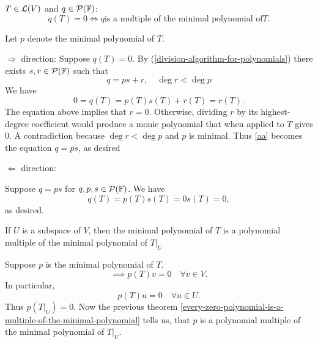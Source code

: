 \setcounter{thm}{28}
\begin{thm}
  \label{thm:every-zero-polynomial-is-a-multiple-of-the-minimal-polynomial}
  $T\in \mathcal{L}(V)$ and $q \in \mathcal{P} (\mathbb{F})$: 
  \begin{equation}
    q(T)=0 \iff q \text{is a multiple of the minimal polynomial of} T.
  \end{equation}
\end{thm}
\begin{prf}
  Let $p$ denote the minimal polynomial of $T$.

	\begin{description}
  
  \item{$\Rightarrow$ direction:}{
			Suppose $q(T)=0$.
			By (\ref{division-algorithm-for-polynomials}) there exists $s,r \in \mathcal{P} (\mathbb{F})$ such that
			\begin{equation}
				q=ps+r, \quad \deg r < \deg p
			\end{equation}
			We have
			\begin{equation}
				\label{aa}
				0 = q(T) = p(T)s(T) + r(T) = r(T).
			\end{equation}
			The equation above implies that $r=0$. Otherwise, dividing $r$ by its highest-degree coefficient would produce a monic polynomial that when applied to $T$ gives $0$. A contradiction because $\deg r < \deg p$ and $p$ is minimal. Thus \ref{aa} becomes the equation $q=ps$, as desired
		}
		\item{$\Leftarrow$ direction:}{
			Suppose $q=ps$ for $q,p,s \in \mathcal{P}(\mathbb{F})$. We have
			\begin{equation}
				q(T) = p(T)s(T)=0s(T)=0,
			\end{equation}
			as desired. 
      
		}
	\end{description}
  
\end{prf}

\setcounter{thm}{30}
\begin{thm}
  \label{minimal-polynomial-of-a-restriction-operator}
  If $U$ is a subspace of $V$, then the minimal polynomial of $T$ is a polynomial multiple of the minimal polynomial of $\left .T \right | _{ U}$
\end{thm}
\begin{prf}
  Suppose $p$ is the minimal polynomial of $T$.
  \begin{equation}
    \implies p(T)v=0 \quad \forall v \in V.
  \end{equation}
  In particular,
  \begin{equation}
    p(T)u=0 \quad \forall u\in U.
  \end{equation} Thus $p\left( \left.T\right|_{U} \right)=0.$ Now the previous theorem
  \ref{every-zero-polynomial-is-a-multiple-of-the-minimal-polynomial} tells us, that $p$ is a polynomial multiple of the minimal polynomial of $\left. T \right |_U$.
  
\end{prf}

